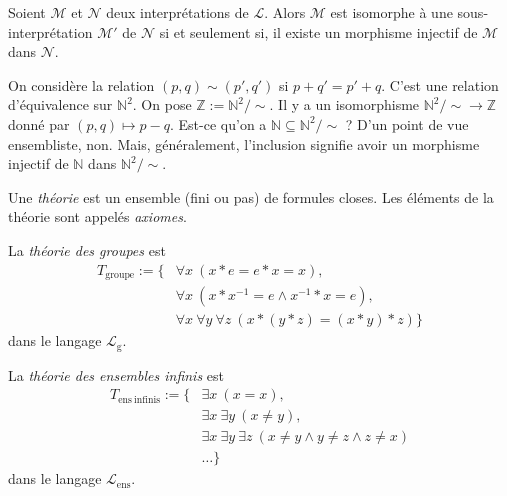 \documentclass[./main]{subfiles}
\begin{document}
  \begin{prop}
    Soient $\mathcal{M}$ et $\mathcal{N}$ deux interprétations de $\mathcal{L}$. Alors $\mathcal{M}$ est isomorphe à une sous-interprétation $\mathcal{M}'$ de $\mathcal{N}$ si et seulement si, il existe un morphisme injectif de $\mathcal{M}$ dans $\mathcal{N}$.
  \end{prop}

  \begin{exm}
    On considère la relation $(p, q) \sim (p', q')$ si  $p + q' = p' + q$.
    C'est une relation d'équivalence sur  $\mathds{N}^2$.
    On pose $\mathds{Z} := \mathds{N}^2 / {\sim}$.
    Il y a un isomorphisme $\mathds{N}^2 / {\sim} \to \mathds{Z}$ donné par $(p,q) \mapsto p - q$.
    Est-ce qu'on a $\mathds{N} \subseteq \mathds{N}^2 / {\sim}$ ?
    D'un point de vue ensembliste, non.
    Mais, généralement, l'inclusion signifie avoir un morphisme injectif de $\mathds{N}$ dans $\mathds{N}^2 / {\sim}$.
  \end{exm}

  \begin{defn}
    Une \textit{théorie} est un ensemble (fini ou pas) de formules closes.
    Les éléments de la théorie sont appelés \textit{axiomes}.
  \end{defn}

  \begin{exm}
    La \textit{théorie des groupes} est
    \begin{align*}
      T_\mathrm{groupe} := \big\{
        &\forall x\: (x * e = e * x = x),\\
        &\forall x\: (x * x^{-1} = e \land x^{-1} * x = e),\\
        &\forall x\: \forall y\: \forall z\: (x * (y*z) = (x*y) *z)
      \big\} 
    \end{align*}
    dans le langage $\mathcal{L}_\mathrm{g}$.
  \end{exm}

  \begin{exm}
    La \textit{théorie des ensembles infinis} est 
    \begin{align*}
      T_\mathrm{ens\ infinis} := \big\{ &\exists x\: (x = x),\\
                               & \exists x\: \exists y\: (x \neq  y),\\
                               & \exists x \: \exists y \: \exists z\: (x \neq y \land y \neq z \land z \neq x)\\
                               &\ldots
      \big\}
    \end{align*}
    dans le langage $\mathcal{L}_\mathrm{ens}$.
  \end{exm}
\end{document}
